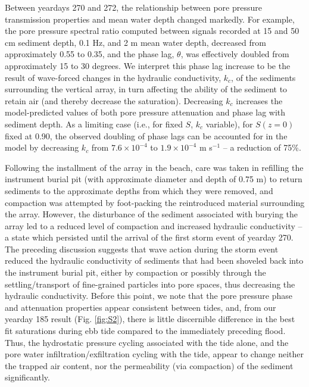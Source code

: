Between yeardays 270 and 272, the relationship between pore pressure transmission properties and mean water depth changed markedly. For example, the pore pressure spectral ratio computed between signals recorded at 15 and 50 cm sediment depth, 0.1 Hz, and 2 m mean water depth, decreased from approximately 0.55 to 0.35, and the phase lag, $\theta$, was effectively doubled from approximately 15 to 30 degrees. We interpret this phase lag increase to be the result of wave-forced changes in the hydraulic conductivity, $k_{c}$, of the sediments surrounding the vertical array, in turn affecting the ability of the sediment to retain air (and thereby decrease the saturation). Decreasing $k_{c}$ increases the model-predicted values of both pore pressure attenuation and phase lag with sediment depth. As a limiting case (i.e., for fixed $S$, $k_{c}$ variable), for $S(z=0)$ fixed at 0.90, the observed doubling of phase lags can be accounted for in the model by decreasing $k_{c}$ from $7.6\times 10^{-4}$ to $1.9\times 10^{-4}$ m s$^{-1}$ -- a reduction of 75\%.

Following the installment of the array in the beach, care was taken in refilling the instrument burial pit (with approximate diameter and depth of 0.75 m) to return sediments to the approximate depths from which they were removed, and compaction was attempted by foot-packing the reintroduced material surrounding the array. However, the disturbance of the sediment associated with burying the array led to a reduced level of compaction and increased hydraulic conductivity -- a state which persisted until the arrival of the first storm event of yearday 270. The preceding discussion suggests that wave action during the storm event reduced the hydraulic conductivity of sediments that had been shoveled back into the instrument burial pit, either by compaction or possibly through the settling/transport of fine-grained particles into pore spaces, thus decreasing the hydraulic conductivity. Before this point, we note that the pore pressure phase and attenuation properties appear consistent between tides, and, from our yearday 185 result (Fig. \ref{fig:S2}), there is little discernible difference in the best fit saturations during ebb tide compared to the immediately preceding flood. Thus, the hydrostatic pressure cycling associated with the tide alone, and the pore water infiltration/exfiltration cycling with the tide, appear to change neither the trapped air content, nor the permeability (via compaction) of the sediment significantly.


